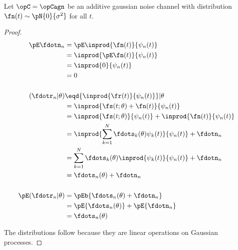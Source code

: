 \begin{theorem}%
\label{thm:agn_stats}
Let $\opC=\opCagn$ be an additive gaussian noise channel
with distribution $\fn(t)\sim\pN{0}{\sigma^2}$ for all $t$.
\end{theorem}
\begin{proof}
\begin{align*}
   \pE\fdotn_{n}
     &= \pE\inprod{\fn(t)}{\psi_n(t)}
   \\&= \inprod{\pE\fn(t)}{\psi_n(t)}
   \\&= \inprod{0}{\psi_n(t)}
   \\&= 0
\\
\\
   (\fdotr_n |\theta)
     &\eqd {\inprod{\fr(t)}{\psi_n(t)}}  |\theta
   \\&=    {\inprod{\fs(t;\theta)+\fn(t)}{\psi_n(t)}}
   \\&=    {\inprod{\fs(t;\theta)}{\psi_n(t)}} +   {\inprod{\fn(t)}{\psi_n(t)}}
   \\&=    \inprod{\sum_{k=1}^N \fdots_k(\theta) \psi_k(t)}{\psi_n(t)} + \fdotn_n
   \\&=    \sum_{k=1}^N \fdots_k(\theta) \inprod{\psi_k(t)}{\psi_n(t)} + \fdotn_n
   \\&=    \fdots_n(\theta)  + \fdotn_n
\\ \\
   \pE({\fdotr_n} | \theta)
     &= \pEb{\fdots_n(\theta)  + \fdotn_n}
   \\&= \pE{\fdots_n(\theta) } +   \pE{\fdotn_n}
   \\&= \fdots_n(\theta)
\end{align*}

The distributions follow because they are linear operations on
Gaussian processes.
\end{proof}





